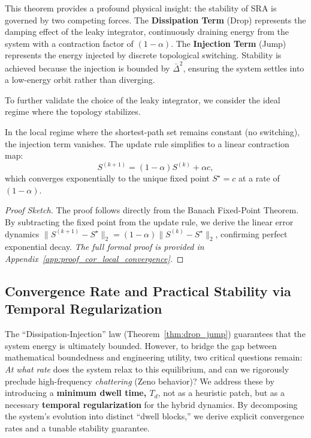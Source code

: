 \documentclass{ccjnl}
\begin{document}
This theorem provides a profound physical insight: the stability of SRA is governed by two competing forces. 
The \textbf{Dissipation Term} (Drop) represents the damping effect of the leaky integrator, continuously draining energy from the system with a contraction factor of $(1-\alpha)$. 
The \textbf{Injection Term} (Jump) represents the energy injected by discrete topological switching. 
Stability is achieved because the injection is bounded by $\bar{\Delta}^2$, ensuring the system settles into a low-energy orbit rather than diverging.

To further validate the choice of the leaky integrator, we consider the ideal regime where the topology stabilizes.

\begin{corollary}
\label{cor:local_convergence}
In the local regime where the shortest-path set remains constant (no switching), the injection term vanishes. The update rule simplifies to a linear contraction map:
\begin{equation}\label{eq:linear_update}
S^{(k+1)}=(1-\alpha)S^{(k)}+\alpha c,
\end{equation}
which converges exponentially to the unique fixed point $S^\star=c$ at a rate of $(1-\alpha)$.
\end{corollary}
\begin{proof}[Proof Sketch]
The proof follows directly from the Banach Fixed-Point Theorem. By subtracting the fixed point from the update rule, we derive the linear error dynamics $\|S^{(k+1)}-S^\star\|_2 = (1-\alpha)\|S^{(k)}-S^\star\|_2$, confirming perfect exponential decay. \textit{The full formal proof is provided in Appendix~\ref{app:proof_cor_local_convergence}.}
\end{proof}

\subsection{Convergence Rate and Practical Stability via Temporal Regularization}
\label{subsec:practical_stability_rate}

The ``Dissipation-Injection'' law (Theorem~\ref{thm:drop_jump}) guarantees that the system energy is ultimately bounded. 
However, to bridge the gap between mathematical boundedness and engineering utility, two critical questions remain: \textit{At what rate} does the system relax to this equilibrium, and can we rigorously preclude high-frequency \textit{chattering} (Zeno behavior)?
We address these by introducing a \textbf{minimum dwell time, $T_d$}, not as a heuristic patch, but as a necessary \textbf{temporal regularization} for the hybrid dynamics.
By decomposing the system's evolution into distinct ``dwell blocks,'' we derive explicit convergence rates and a tunable stability guarantee.
\end{document}
